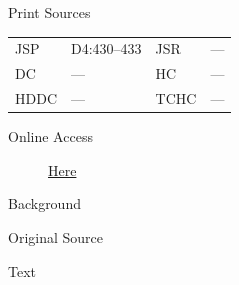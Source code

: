 			\begin{description}
				\item[Print Sources]
			\end{description}

				\begin{tabular}{p{0.5in}p{1in}p{0.5in}p{1in}}
				JSP	 	& D4:430--433		& JSR 		& --- \\
				DC	 	& --- 		& HC 		& --- \\
				HDDC 	& ---		& TCHC 		& --- \\
				\end{tabular}
			
			\begin{description}
				\item[Online Access] \href{https://www.josephsmithpapers.org/paper-summary/blessing-to-john-whitmer-22-september-1835/1}{Here}
			\end{description}
			
			\begin{description}
				\item[Background]
			\end{description}
			
			
			\begin{description}
				\item[Original Source]
			\end{description}
			
			
			\begin{description}
				\item[Text]
			\end{description}
			
